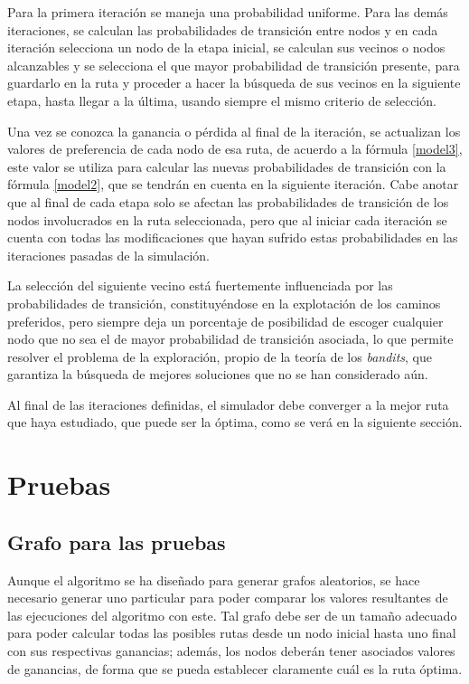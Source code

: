 Para la primera iteración se maneja una probabilidad uniforme. Para las demás iteraciones, se calculan las probabilidades de transición entre nodos y en cada iteración selecciona un nodo de la etapa inicial, se calculan sus vecinos o nodos alcanzables y se selecciona el que mayor probabilidad de transición presente, para guardarlo en la ruta y proceder a hacer la búsqueda de sus vecinos en la siguiente etapa, hasta llegar a la última, usando siempre el mismo criterio de selección.

Una vez se conozca la ganancia o pérdida al final de la iteración, se actualizan los valores de preferencia de cada nodo de esa ruta, de acuerdo a la fórmula \ref{model3}, este valor se utiliza para calcular las nuevas probabilidades de transición con la fórmula \ref{model2}, que se tendrán en cuenta en la siguiente iteración. Cabe anotar que al final de cada etapa solo se afectan las probabilidades de transición de los nodos involucrados en la ruta seleccionada, pero que al iniciar cada iteración se cuenta con todas las modificaciones que hayan sufrido estas probabilidades en las iteraciones pasadas de la simulación.

La selección del siguiente vecino está fuertemente influenciada por las probabilidades de transición, constituyéndose en la explotación de los caminos preferidos, pero siempre deja un porcentaje de posibilidad de escoger cualquier nodo que no sea el de mayor probabilidad de transición asociada, lo que permite resolver el problema de la exploración, propio de la teoría de los \textit{bandits}, que garantiza la búsqueda de mejores soluciones que no se han considerado aún.

Al final de las iteraciones definidas, el simulador debe converger a la mejor ruta que haya estudiado, que puede ser la óptima, como se verá en la siguiente sección.

\section{Pruebas}

\subsection{Grafo para las pruebas}

Aunque el algoritmo se ha diseñado para generar grafos aleatorios, se hace necesario generar uno particular para poder comparar los valores resultantes de las ejecuciones del algoritmo con este. Tal grafo debe ser de un tamaño adecuado para poder calcular todas las posibles rutas desde un nodo inicial hasta uno final con sus respectivas ganancias; además, los nodos deberán tener asociados valores de ganancias, de forma que se pueda establecer claramente cuál es la ruta óptima.

